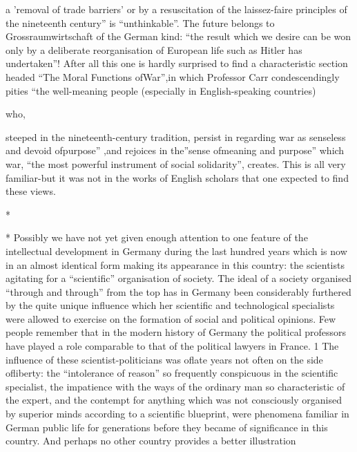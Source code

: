 \documentclass[11pt,openany]{book}
\begin{document}
a 'removal of trade barriers' or by a resuscitation of the laissez-faire principles of the nineteenth century'' is ``unthinkable''. The future belongs to Grossraumwirtschaft of the German kind: ``the result which we desire can be won only by a deliberate reorganisation of European life such as Hitler has undertaken''! After all this one is hardly surprised to find a characteristic section headed ``The Moral Functions ofWar'',in which Professor Carr condescendingly pities ``the well-meaning people (especially in English-speaking countries)

who,

steeped in the nineteenth-century tradition, persist in regarding war as senseless and devoid ofpurpose'' ,and rejoices in the''sense ofmeaning and purpose'' which war, ``the most powerful instrument of social solidarity'', creates. This is all very familiar-but it was not in the works of English scholars that one expected to find these views.

\begin{center}\textasteriskcentered\hspace{0.9em}\textasteriskcentered\hspace{0.9em}\textasteriskcentered\end{center}

\begin{center}\textasteriskcentered\hspace{0.9em}\textasteriskcentered\hspace{0.9em}\textasteriskcentered\end{center}

\begin{center}\textasteriskcentered\hspace{0.9em}\textasteriskcentered\hspace{0.9em}\textasteriskcentered\end{center}

*

* Possibly we have not yet given enough attention to one feature of the intellectual development in Germany during the last hundred years which is now in an almost identical form making its appearance in this country: the scientists agitating for a ``scientific'' organisation of society. The ideal of a society organised ``through and through'' from the top has in Germany been considerably furthered by the quite unique influence which her scientific and technological specialists were allowed to exercise on the formation of social and political opinions. Few people remember that in the modern history of Germany the political professors have played a role comparable to that of the political lawyers in France. 1 The influence of these scientist-politicians was oflate years not often on the side ofliberty: the ``intolerance of reason'' so frequently conspicuous in the scientific specialist, the impatience with the ways of the ordinary man so characteristic of the expert, and the contempt for anything which was not consciously organised by superior minds according to a scientific blueprint, were phenomena familiar in German public life for generations before they became of significance in this country. And perhaps no other country provides a better illustration
\end{document}
